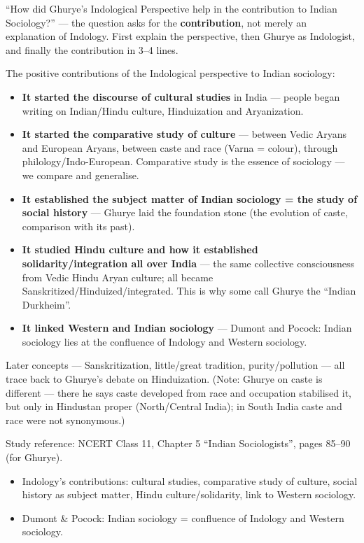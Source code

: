 \begin{PYQLink}
``How did Ghurye's Indological Perspective help in the contribution to Indian Sociology?'' --- the question asks for the \textbf{contribution}, not merely an explanation of Indology. First explain the perspective, then Ghurye as Indologist, and finally the contribution in 3--4 lines.
\end{PYQLink}

The positive contributions of the Indological perspective to Indian sociology:
\begin{itemize}
\item \textbf{It started the discourse of cultural studies} in India --- people began writing on Indian/Hindu culture, Hinduization and Aryanization.
\item \textbf{It started the comparative study of culture} --- between Vedic Aryans and European Aryans, between caste and race (Varna = colour), through philology/Indo-European. Comparative study is the essence of sociology --- we compare and generalise.
\item \textbf{It established the subject matter of Indian sociology = the study of social history} --- Ghurye laid the foundation stone (the evolution of caste, comparison with its past).
\item \textbf{It studied Hindu culture and how it established solidarity/integration all over India} --- the same collective consciousness from Vedic Hindu Aryan culture; all became Sanskritized/Hinduized/integrated. This is why some call Ghurye the ``Indian Durkheim''.
\item \textbf{It linked Western and Indian sociology} --- Dumont and Pocock: Indian sociology lies at the confluence of Indology and Western sociology.
\end{itemize}

\begin{CriticalPoint}
Later concepts --- Sanskritization, little/great tradition, purity/pollution --- all trace back to Ghurye's debate on Hinduization. (Note: Ghurye on caste is different --- there he says caste developed from race and occupation stabilised it, but only in Hindustan proper (North/Central India); in South India caste and race were not synonymous.)
\end{CriticalPoint}

\begin{DataFact}
Study reference: NCERT Class 11, Chapter 5 ``Indian Sociologists'', pages 85--90 (for Ghurye).
\end{DataFact}

\begin{QuickRevision}
\begin{itemize}
\item Indology's contributions: cultural studies, comparative study of culture, social history as subject matter, Hindu culture/solidarity, link to Western sociology.
\item Dumont \& Pocock: Indian sociology = confluence of Indology and Western sociology.
\end{itemize}
\end{QuickRevision}
